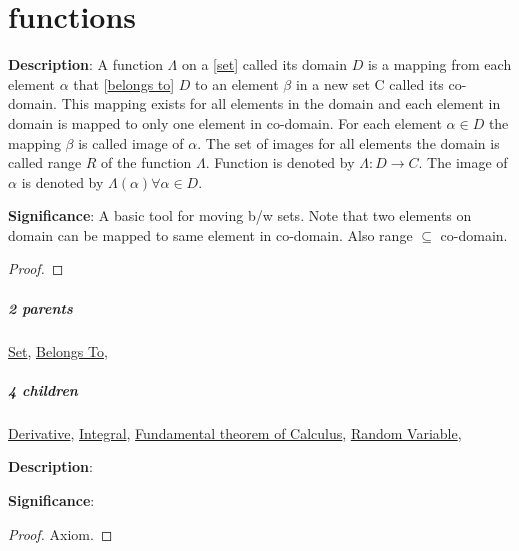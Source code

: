 \documentclass[../main.tex]{subfiles}
\begin{document}
\chapter{functions}


\begin{statement}
\label{statement:Function}\hspace*{0pt}\par
\end{statement}
\textbf{Description}:
A function $ \Lambda $ on a [\hyperref[statement:Set]{set}] called its domain $ D $ is a mapping from each element $ \alpha $ that [\hyperref[statement:Belongs To]{belongs to}] $ D $ to an element $ \beta $ in a new set C called its co-domain.
This mapping exists for all elements in the domain and each element in domain is mapped to only one element in co-domain.
For each element $ \alpha \in D $ the mapping $ \beta $ is called image of $ \alpha $.
The set of images for all elements the domain is called range $ R $ of the function $ \Lambda $.
Function is denoted by $ \Lambda:D \to C $. The image of $ \alpha $ is denoted by $ \Lambda(\alpha) \forall \alpha \in D $.
\par
{\color{magenta} \textbf{Significance}:
A basic tool for moving b/w sets.
Note that two elements on domain can be mapped to same element in co-domain.
Also range $ \subseteq $ co-domain.
\par}
\begin{proof}
\proofbydefinition
\end{proof}\par
\paragraph{2 parents} \hyperref[statement:Set]{Set}, \hyperref[statement:Belongs To]{Belongs To}, 
\paragraph{4 children} \hyperref[statement:Derivative]{Derivative}, \hyperref[statement:Integral]{Integral}, \hyperref[statement:Fundamental theorem of Calculus]{Fundamental theorem of Calculus}, \hyperref[statement:Random Variable]{Random Variable}, 



\begin{statement}
\label{statement:Injection}\hspace*{0pt}\par
\end{statement}
\textbf{Description}:{\color{red} \todo}\par
{\color{magenta} \textbf{Significance}:{\color{red} \todo}\par}
\begin{proof}Axiom.\end{proof}\par
\end{document}
